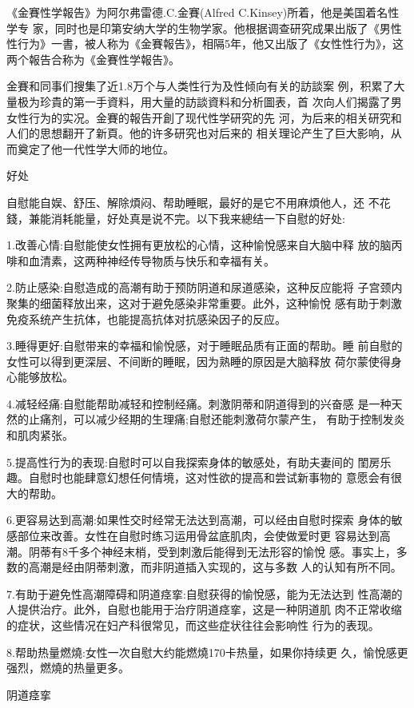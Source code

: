 \documentclass[12pt,UTF8]{ctexbook}
\begin{document}
《金賽性学報告》为阿尔弗雷德.C.金賽(Alfred C.Kinsey)所着，他是美国着名性学专
家，同时也是印第安纳大学的生物学家。他根据调查研究成果出版了《男性性行为》一書，被人称为《金賽報告》，相隔5年，他又出版了《女性性行为》，这两个報告合称为《金賽性学報告》。

金賽和同事们搜集了近1.8万个与人类性行为及性倾向有关的訪談案
例，积累了大量极为珍貴的第一手資料，用大量的訪談資料和分析圖表，首
次向人们揭露了男女性行为的实况。金賽的報告开創了现代性学研究的先
河，为后来的相关研究和人们的思想翻开了新頁。他的许多研究也对后来的
相关理论产生了巨大影响，从而奠定了他一代性学大师的地位。

好处

自慰能自娱、舒压、解除煩闷、帮助睡眠，最好的是它不用麻煩他人，还
不花錢，兼能消耗能量，好处真是说不完。以下我来總结一下自慰的好处:

1.改善心情:自慰能使女性拥有更放松的心情，这种愉悅感来自大脑中释
放的脑丙啡和血清素，这两种神经传导物质与快乐和幸福有关。

2.防止感染:自慰造成的高潮有助于预防阴道和尿道感染，这种反应能将
子宫颈内聚集的细菌释放出来，这对于避免感染非常重要。此外，这种愉悅
感有助于刺激免疫系统产生抗体，也能提高抗体对抗感染因子的反应。

3.睡得更好:自慰带来的幸福和愉悅感，对于睡眠品质有正面的帮助。睡
前自慰的女性可以得到更深层、不间断的睡眠，因为熟睡的原因是大脑释放
荷尔蒙使得身心能够放松。

4.减轻经痛:自慰能帮助减轻和控制经痛。刺激阴蒂和阴道得到的兴奋感
是一种天然的止痛剂，可以减少经期的生理痛;自慰还能刺激荷尔蒙产生，
有助于控制发炎和肌肉紧张。

5.提高性行为的表现:自慰时可以自我探索身体的敏感处，有助夫妻间的
閨房乐趣。自慰时也能肆意幻想任何情境，这对性欲的提高和尝试新事物的
意愿会有很大的帮助。

6.更容易达到高潮:如果性交时经常无法达到高潮，可以经由自慰时探索
身体的敏感部位来改善。女性在自慰时练习运用骨盆底肌肉，会使做爱时更
容易达到高潮。阴蒂有8千多个神经末梢，受到刺激后能得到无法形容的愉悅
感。事实上，多数的高潮是经由阴蒂刺激，而非阴道插入实现的，这与多数
人的认知有所不同。

7.有助于避免性高潮障碍和阴道痉挛:自慰获得的愉悅感，能为无法达到
性高潮的人提供治疗。此外，自慰也能用于治疗阴道痉挛，这是一种阴道肌
肉不正常收缩的症状，这些情况在妇产科很常见，而这些症状往往会影响性
行为的表现。

8.帮助热量燃燒:女性一次自慰大约能燃燒170卡热量，如果你持续更
久，愉悅感更强烈，燃燒的热量更多。

阴道痉挛
\end{document}
